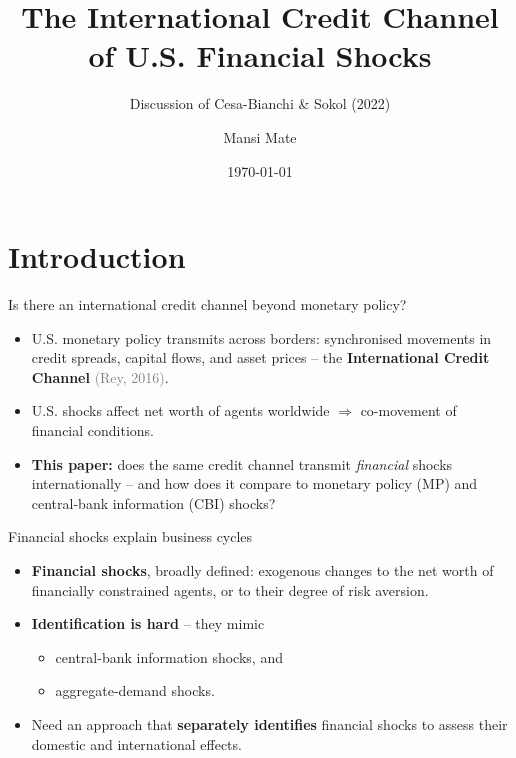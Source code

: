 \documentclass[10pt]{beamer}
\title{The International Credit Channel of U.S. Financial Shocks}
\subtitle{Discussion of Cesa-Bianchi \& Sokol (2022)}
\date{\today}
\author{Mansi Mate}
\institute{Advanced Macro \\ Graduate Institute}
\begin{document}
\maketitle

\section{Introduction}

\begin{frame}{Is there an international credit channel beyond monetary policy?}
\begin{itemize}
    \item U.S. monetary policy transmits across borders: synchronised movements in credit spreads, capital flows, and asset prices -- the \textbf{International Credit Channel} \textcolor{gray}{\scriptsize(Rey, 2016)}.
    \vspace{0.3em}
    \item U.S. shocks affect net worth of agents worldwide $\Rightarrow$ co-movement of financial conditions.
    \vspace{0.3em}
    \item \textbf{This paper:} does the same credit channel transmit \emph{financial} shocks internationally -- and how does it compare to monetary policy (MP) and central-bank information (CBI) shocks?
\end{itemize}
\end{frame}


\begin{frame}{Financial shocks explain business cycles}
\begin{itemize}
    \item \textbf{Financial shocks}, broadly defined: exogenous changes to the net worth of financially constrained agents, or to their degree of risk aversion.
    \vspace{0.4em}
    \item \textbf{Identification is hard} -- they mimic
    \begin{itemize}
        \item central-bank information shocks, and
        \item aggregate-demand shocks.
    \end{itemize}
    \vspace{0.4em}
    \item Need an approach that \textbf{separately identifies} financial shocks to assess their domestic and international effects.
\end{itemize}
\end{frame}
\end{document}
